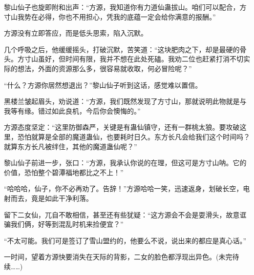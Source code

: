 \begin{this_body}
黎山仙子也旋即附和出声：“方源，我知道你有力道仙蛊拔山。咱们可以配合，方寸山我势在必得，你也不用担心，凭我的底蕴一定会给你满意的报酬。”

方源没有立即答应，而是低头思索，陷入沉默。

几个呼吸之后，他缓缓摇头，打破沉默，苦笑道：“这块肥肉之下，却是最硬的骨头。方寸山虽好，但时间有限，我并不想在此处死磕。我劝二位也赶紧打消不切实际的想法，外面的资源那么多，很容易就收取，何必冒险呢？”

“什么？方源你居然想退出？”黎山仙子听到这话，感觉难以置信。

黑楼兰皱起眉头，劝说道：“方源，我们既然发现了方寸山，那就说明此物就是与我等有缘。错过如此良机，今后你会懊悔的。”

方源态度坚定：“这里防御森严，关键是有蛊仙镇守，还有一群桃太狼。要攻破这里，恐怕就算是全部的魔道蛊仙，也要耗时日久。东方长凡会给我们这个时间吗？就算东方长凡被绊住，其他的魔道蛊仙呢？”

黎山仙子前进一步，张口：“方源，我承认你说的在理，但这可是方寸山呐。它的价值，恐怕整个碧潭福地都比之不上！”

“哈哈哈，仙子，你不必再劝了。告辞！”方源哈哈一笑，迅速返身，划破长空，电射而去，竟是如此干净利落。

留下二女仙，兀自不敢相信，甚至还有些犹疑：“这方源会不会是耍滑头，故意诓骗我们俩，好等到混乱时机来捡便宜？”

“不太可能。我们可是签订了雪山盟约的，他要么不说，说出来的都应是真心话。”

一时间，望着方源快要消失在天际的背影，二女的脸色都浮现出异色。(未完待续……)

\end{this_body}

